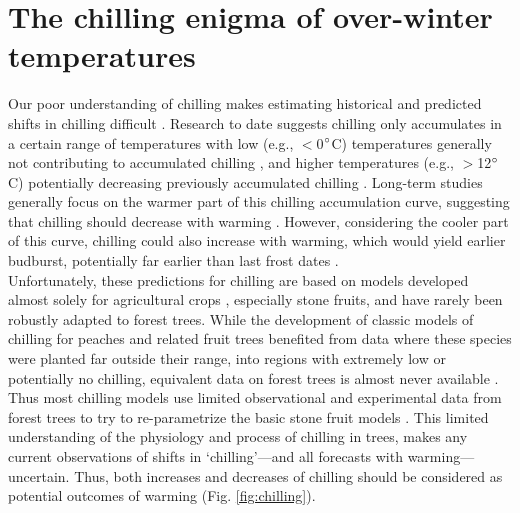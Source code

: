 \documentclass[11pt]{article}
\begin{document}
\section{The chilling enigma of over-winter temperatures}
Our poor understanding of chilling makes estimating historical and predicted shifts in chilling difficult \citep{chuine2016}. Research to date suggests chilling only accumulates in a certain range of temperatures with low (e.g., $<$0$\degree$C) temperatures generally not contributing to accumulated chilling \citep[but see][]{baum2021}, and higher temperatures (e.g., $>$12$\degree$C) potentially decreasing previously accumulated chilling \citep[see Fig. \ref{fig:chilling} and][]{richardson1974,fishman1987}. Long-term studies generally focus on the warmer part of this chilling accumulation curve, suggesting that chilling should decrease with warming \citep{fu2015,piao2017,gauzere2019}.  However, considering the cooler part of this curve, chilling could also increase with warming, which would yield earlier budburst, potentially far earlier than last frost dates \citep[][]{guy2014}. \\

Unfortunately, these predictions for chilling are based on models developed almost solely for agricultural crops \citep[but see][]{harrington2015}, especially stone fruits, and have rarely been robustly adapted to forest trees. While the development of classic models of chilling for peaches and related fruit trees benefited from data where these species were planted far outside their range, into regions with extremely low or potentially no chilling, equivalent data on forest trees is almost never available \citep{dennis2003}. Thus most chilling models use limited observational and experimental data from forest trees to try to re-parametrize the basic stone fruit models \citep{Chuine2000,chuine2016}. This limited understanding of the physiology and process of chilling in trees, makes any current observations of shifts in `chilling'---and all forecasts with warming---uncertain. Thus, both increases and decreases of chilling should be considered as potential outcomes of warming (Fig. \ref{fig:chilling}). \\
\end{document}
